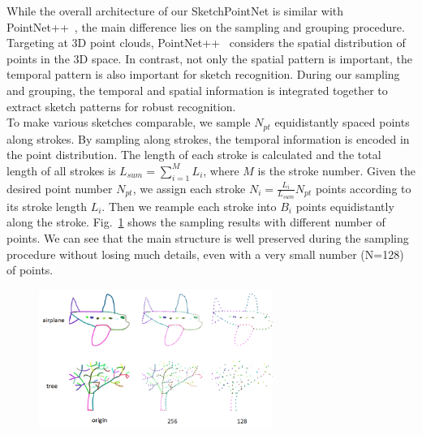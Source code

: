 While the overall architecture of our SketchPointNet is similar with PointNet++~\cite{qi2017pointnetplusplus}, the main difference lies on the sampling and grouping procedure.
Targeting at 3D point clouds, PointNet++~\cite{qi2017pointnetplusplus} considers the spatial distribution of points in the 3D space.
In contrast, not only the spatial pattern is important, the temporal pattern is also important for sketch recognition.
%
During our sampling and grouping, the temporal and spatial information is integrated together to extract sketch patterns for robust recognition.
\\


To make various sketches comparable, we sample $N_{pt}$ equidistantly spaced points along strokes.
By sampling along strokes, the temporal information is encoded in the point distribution.
%
The length of each stroke is calculated and the total length of all strokes is $L_{sum}=\sum^{M}_{i=1} L_i$, where $M$ is the stroke number.
%
Given the desired point number $N_{pt}$, we assign each stroke $N_i=\frac{L_i}{L_{sum}}N_{pt}$ points according to its stroke length $L_i$.
Then we reample each stroke into $B_i$ points equidistantly along the stroke.
%
Fig.~\ref{fig:resample} shows the sampling results with different number of points.
We can see that the main structure is well preserved during the sampling procedure without losing much details, even with a very small number (N=128) of points.
\\

\begin{figure}
	\center
	\includegraphics[width=3in]{images/resample2.png}
	\label{fig:resample}
\end{figure}



